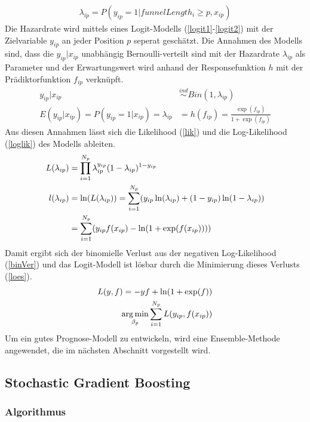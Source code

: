 \begin{align}
	\lambda_{ip} = P(y_{ip}=1|funnelLength_i \geq p, x_{ip}) \label{haz}
\end{align}
Die Hazardrate wird mittels eines Logit-Modells (\ref{logit1}-\ref{logit2}) mit der Zielvariable $y_{ip}$ an jeder Position $p$ seperat geschätzt. Die Annahmen des Modells sind, dass die $y_{ip}|x_{ip}$ unabhängig Bernoulli-verteilt sind mit der Hazardrate $\lambda_{ip}$ als Parameter und der Erwartungswert wird anhand der Responsefunktion $h$ mit der Prädiktorfunktion $f_{ip}$ verknüpft.
\begin{align}
	y_{ip}|x_{ip} &\stackrel{ind}{\sim} Bin(1, \lambda_{ip}) \label{logit1} \\
	E(y_{ip}|x_{ip}) = P(y_{ip} = 1|x_{ip}) = \lambda_{ip} &= h(f_{ip}) = \frac{\exp(f_{ip})}{1+\exp(f_{ip})}\label{logit2}
\end{align}
Aus diesen Annahmen lässt sich die Likelihood (\ref{lik}) und die Log-Likelihood (\ref{loglik}) des Modells ableiten.
\begin{align}
	L(\lambda_{ip}) &= \prod_{i=1}^{N_p} \lambda_{ip}^{y_{ip}} (1-\lambda_{ip})^{1-y_{ip}} \label{lik} \\
	l(\lambda_{ip}) &= \ln(L(\lambda_{ip})) = \sum_{i=1}^{N_p} (y_{ip} \ln(\lambda_{ip}) + (1-y_{ip}) \ln(1-\lambda_{ip})) \notag \\
	&= \sum_{i=1}^{N_p} (y_{ip} f(x_{ip}) - \ln(1+\exp(f(x_{ip})))) \label{loglik}
\end{align}
Damit ergibt sich der binomielle Verlust aus der negativen Log-Likelihood (\ref{binVer}) und das Logit-Modell ist lösbar durch die Minimierung dieses Verlusts (\ref{loes}).
\begin{align}
	L(y,f) = -yf + \ln(1+\exp(f)) \label{binVer} \\
	\operatorname*{arg\,min}_{\beta_p} \sum_{i=1}^{N_p} L(y_{ip},f(x_{ip})) \label{loes}
\end{align}
Um ein gutes Prognose-Modell zu entwickeln, wird eine Ensemble-Methode angewendet, die im nächsten Abschnitt vorgestellt wird.

\subsection{Stochastic Gradient Boosting}\label{secModel2}

\subsubsection*{Algorithmus}

